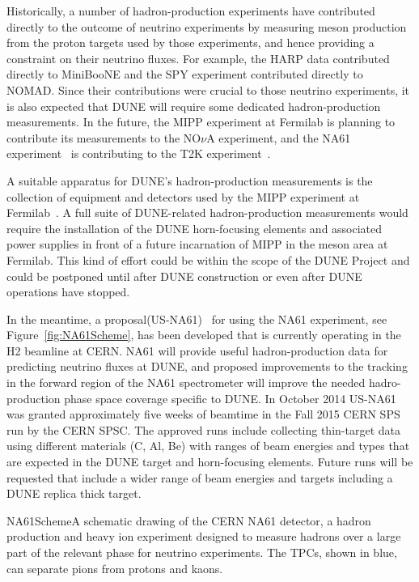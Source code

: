 Historically, a number of hadron-production experiments have
contributed directly to the outcome of neutrino experiments
by measuring meson production from the proton targets used
by those experiments, and hence providing a constraint on their neutrino fluxes. 
For example, the HARP data\cite{ref:HARP} contributed directly to
MiniBooNE and the SPY\cite{ref:SPY} experiment contributed directly to
NOMAD. Since their contributions were crucial to those neutrino experiments, 
it is also expected that DUNE will require some dedicated hadron-production measurements.
In the future, the MIPP experiment at Fermilab is planning to contribute its
measurements to the NO$\nu$A experiment, and the NA61
experiment~\cite{Abgrall:2011ae, Abgrall:2011ts} is contributing to the T2K
experiment~\cite{Abe:2012av}.

A suitable apparatus for DUNE's hadron-production measurements
is the collection of equipment and detectors used by the MIPP experiment at Fermilab~\cite{Isenhower:2006zp}.   
A full suite of DUNE-related
hadron-production measurements would require the installation of the DUNE horn-focusing
elements and associated power supplies in front of a future
incarnation of MIPP in the meson area at Fermilab.
This kind of effort could be within the scope of the DUNE Project and could be postponed
until after DUNE construction or even after DUNE operations have
stopped. 

In the meantime, a proposal(US-NA61)~\cite{NA61:2014fnalbeams} for using the NA61 experiment, see Figure~\ref{fig:NA61Scheme}, has been developed
that is currently operating in the H2 beamline at CERN. NA61 will provide useful 
hadron-production data for predicting neutrino fluxes at DUNE, and proposed improvements 
to the tracking in the forward region of the NA61 spectrometer will improve the needed 
hadro-production phase space coverage specific to DUNE. In October 2014 US-NA61 was granted approximately
five weeks of beamtime in the Fall 2015 CERN SPS run by the CERN SPSC. The approved
runs include collecting thin-target data using different materials (C, Al, Be) with 
ranges of beam energies and types  that are expected in the DUNE target and horn-focusing elements. 
Future runs will be requested that include a wider range of beam energies and targets including a DUNE
replica thick target. 


\begin{cdrfigure}{NA61Scheme}{A schematic drawing of the CERN NA61 detector, a hadron production and heavy ion experiment 
designed to measure hadrons over a large part of the relevant phase for 
neutrino experiments. The TPCs, shown in blue, can separate pions from protons and kaons.}
\end{cdrfigure}
